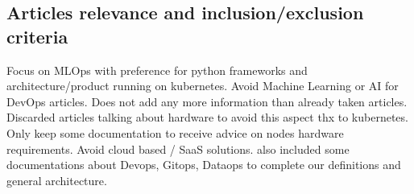 \subsection{Articles relevance and inclusion/exclusion criteria}\label{subsec:articles-relevance-and-inclusion/exclusion-criteria}

Focus on MLOps with preference for python frameworks and architecture/product running on kubernetes.
Avoid Machine Learning or AI for DevOps articles.
Does not add any more information than already taken articles.
Discarded articles talking about hardware to avoid this aspect thx to kubernetes.
Only keep some documentation to receive advice on nodes hardware requirements.
Avoid cloud based / SaaS solutions.
also included some documentations about Devops, Gitops, Dataops to complete our definitions and general architecture.